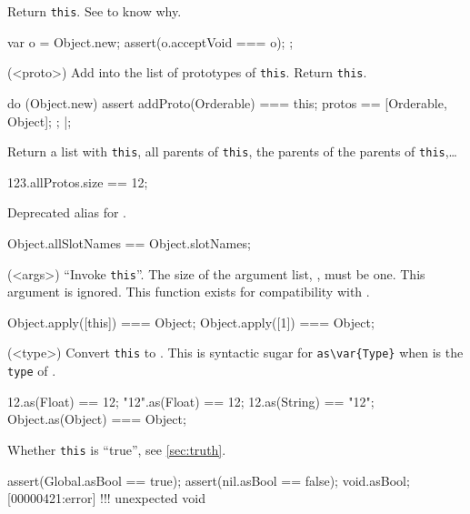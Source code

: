 \begin{urbiscriptapi}
\item[acceptVoid]
  Return \lstinline|this|.  See  to know why.
\begin{urbiscript}
{
  var o = Object.new;
  assert(o.acceptVoid === o);
};
\end{urbiscript}


\item[addProto](<proto>)%
  Add  into the list of prototypes of \lstinline|this|.
  Return \lstinline|this|.
\begin{urbiscript}
do (Object.new)
{
  assert
  {
    addProto(Orderable) === this;
    protos == [Orderable, Object];
  };
}|;
\end{urbiscript}

\item[allProto]
  Return a list with \lstinline|this|, all parents of
  \lstinline|this|, the parents of the parents of
  \lstinline|this|,\ldots
\begin{urbiassert}
123.allProtos.size == 12;
\end{urbiassert}

\item[allSlotNames]
  Deprecated alias for .
\begin{urbiassert}
Object.allSlotNames == Object.slotNames;
\end{urbiassert}

\item[apply](<args>)%
  ``Invoke \lstinline|this|''.  The size of the argument list,
  , must be one.  This argument is ignored.  This function
  exists for compatibility with .
\begin{urbiassert}
Object.apply([this]) === Object;
Object.apply([1])    === Object;
\end{urbiassert}

\item[as](<type>)%
  Convert \lstinline|this| to .  This is syntactic sugar for
  \lstinline|as\var{Type}| when  is the \lstinline|type| of
  .
\begin{urbiassert}
12.as(Float) == 12;
"12".as(Float) == 12;
12.as(String) == "12";
Object.as(Object) === Object;
\end{urbiassert}

\item[asBool]
  Whether \lstinline|this| is ``true'', see \autoref{sec:truth}.
\begin{urbiscript}
assert(Global.asBool == true);
assert(nil.asBool ==    false);
void.asBool;
[00000421:error] !!! unexpected void
\end{urbiscript}


\end{urbiscriptapi}
